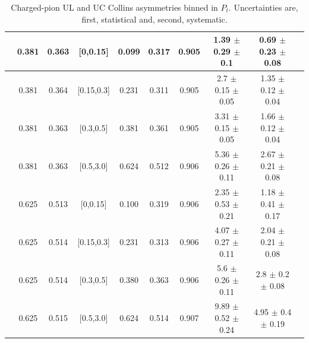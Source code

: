 \begin{table}[H]
\begin{tabular}{|c| c| c| c| c| c| c| c| c| c|}
\hline
[0.3,0.5]	&	0.381	&	0.363	&	[0,0.15]	&	0.099	&	0.317	&	0.905	&1.39  $\pm$ 0.29  $\pm$ 0.1   & 0.69  $\pm$ 0.23  $\pm$ 0.08 \\ \hline
[0.3,0.5]	&	0.381	&	0.364	&	[0.15,0.3]	&	0.231	&	0.311	&	0.905	&2.7  $\pm$ 0.15  $\pm$ 0.05   & 1.35  $\pm$ 0.12  $\pm$ 0.04 \\ \hline
[0.3,0.5]	&	0.381	&	0.363	&	[0.3,0.5]	&	0.381	&	0.361	&	0.905	&3.31  $\pm$ 0.15  $\pm$ 0.05  & 1.66  $\pm$ 0.12  $\pm$ 0.04 \\ \hline
[0.3,0.5]	&	0.381	&	0.363	&	[0.5,3.0]	&	0.624	&	0.512	&	0.906	&5.36  $\pm$ 0.26  $\pm$ 0.11  & 2.67  $\pm$ 0.21  $\pm$ 0.08 \\ \hline
\hline
[0.5,3.0]	&	0.625	&	0.513	&	[0,0.15]	&	0.100	&	0.319	&	0.906	&2.35  $\pm$ 0.53  $\pm$ 0.21  & 1.18  $\pm$ 0.41  $\pm$ 0.17 \\ \hline
[0.5,3.0]	&	0.625	&	0.514	&	[0.15,0.3]	&	0.231	&	0.313	&	0.906	&4.07  $\pm$ 0.27  $\pm$ 0.11  & 2.04  $\pm$ 0.21  $\pm$ 0.08 \\ \hline
[0.5,3.0]	&	0.625	&	0.514	&	[0.3,0.5]	&	0.380	&	0.363	&	0.906	&5.6  $\pm$ 0.26  $\pm$ 0.11   & 2.8  $\pm$ 0.2  $\pm$ 0.08   \\ \hline
[0.5,3.0]	&	0.625	&	0.515	&	[0.5,3.0]	&	0.624	&	0.514	&	0.907	&9.89  $\pm$ 0.52  $\pm$ 0.24  & 4.95  $\pm$ 0.4  $\pm$ 0.19  \\ \hline
\end{tabular}
\caption[Charged-pion UL and UC Collins asymmetries binned in $P_t$]{Charged-pion UL and UC Collins asymmetries binned in $P_t$. Uncertainties are, first, statistical and, second, systematic.}
\label{tab:finalulucptbins}
\end{table}

